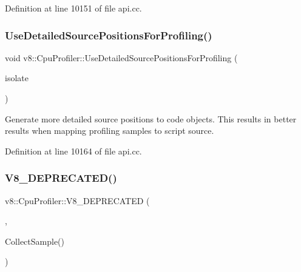Definition at line 10151 of file api.\+cc.

\mbox{\label{classv8_1_1CpuProfiler_ad1e90d4c2c68bb978d73bbdd2308399f}} 
\subsubsection{\texorpdfstring{Use\+Detailed\+Source\+Positions\+For\+Profiling()}{UseDetailedSourcePositionsForProfiling()}}
{\footnotesize\ttfamily void v8\+::\+Cpu\+Profiler\+::\+Use\+Detailed\+Source\+Positions\+For\+Profiling (\begin{DoxyParamCaption}\item[{Isolate $\ast$}]{isolate }\end{DoxyParamCaption})\hspace{0.3cm}{\ttfamily [static]}}

Generate more detailed source positions to code objects. This results in better results when mapping profiling samples to script source. 

Definition at line 10164 of file api.\+cc.

\mbox{\label{classv8_1_1CpuProfiler_a8ddea26e13e631875cb41dcb2563ff40}} 
\subsubsection{\texorpdfstring{V8\+\_\+\+D\+E\+P\+R\+E\+C\+A\+T\+E\+D()}{V8\_DEPRECATED()}\hspace{0.1cm}{\footnotesize\ttfamily [1/2]}}
{\footnotesize\ttfamily v8\+::\+Cpu\+Profiler\+::\+V8\+\_\+\+D\+E\+P\+R\+E\+C\+A\+T\+ED (\begin{DoxyParamCaption}\item[{\char`\"{}Use static \mbox{\hyperlink{classv8_1_1CpuProfiler_a067e1af52938e37ca4776ead4bfa7847}{Collect\+Sample}}(Isolate$\ast$) instead.\char`\"{}}]{,  }\item[{void }]{Collect\+Sample() }\end{DoxyParamCaption})}

